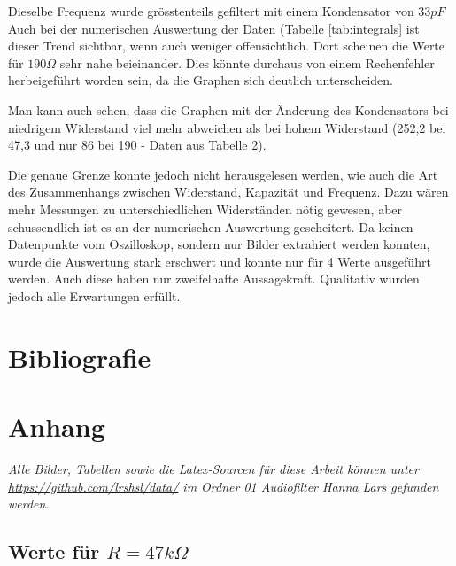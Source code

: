 \documentclass{article}
\begin{document}
Dieselbe Frequenz wurde grösstenteils gefiltert mit einem Kondensator von $33pF$
Auch bei der numerischen Auswertung der Daten (Tabelle \ref{tab:integrals} ist dieser Trend sichtbar, wenn auch weniger offensichtlich. Dort scheinen die Werte für $190\Omega$ sehr nahe beieinander. Dies könnte durchaus von einem Rechenfehler herbeigeführt worden sein, da die Graphen sich deutlich unterscheiden.

Man kann auch sehen, dass die Graphen mit der Änderung des Kondensators bei niedrigem Widerstand viel mehr abweichen als bei hohem Widerstand (252,2 bei 47,3 und nur 86 bei 190 - Daten aus Tabelle 2).

Die genaue Grenze konnte jedoch nicht herausgelesen werden, wie auch die Art des Zusammenhangs zwischen Widerstand, Kapazität und Frequenz. Dazu wären mehr Messungen zu unterschiedlichen Widerständen nötig gewesen, aber schussendlich ist es an der numerischen Auswertung gescheitert. Da keinen Datenpunkte vom Oszilloskop, sondern nur Bilder extrahiert werden konnten, wurde die Auswertung stark erschwert und konnte nur für 4 Werte ausgeführt werden. Auch diese haben nur zweifelhafte Aussagekraft.
Qualitativ wurden jedoch alle Erwartungen erfüllt.

\newpage

\section{Bibliografie}
\printbibliography{} %

\section{Anhang}

\emph{
    Alle Bilder, Tabellen sowie die Latex-Sourcen für diese Arbeit können unter
    \href{https://github.com/lrshsl/data/}{https://github.com/lrshsl/data/} im Ordner \emph{01 Audiofilter Hanna Lars} gefunden werden.
}

\newpage
\subsection{Werte für $R = 47k\Omega$}
\end{document}
